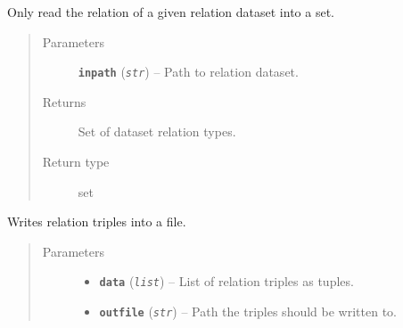 \documentclass[letterpaper,10pt,english]{sphinxmanual}
\begin{document}

\begin{fulllineitems}
\label{src.trans_e:src.trans_e.partition_data.read_only_relations_into_set}
Only read the relation of a given relation dataset into a set.
\begin{quote}\begin{description}
\item[{Parameters}] \leavevmode
\textbf{\texttt{inpath}} (\emph{\texttt{str}}) -- Path to relation dataset.

\item[{Returns}] \leavevmode
Set of dataset relation types.

\item[{Return type}] \leavevmode
set

\end{description}\end{quote}

\end{fulllineitems}


\begin{fulllineitems}
\label{src.trans_e:src.trans_e.partition_data.write_data_in_file}
Writes relation triples into a file.
\begin{quote}\begin{description}
\item[{Parameters}] \leavevmode\begin{itemize}
\item {} 
\textbf{\texttt{data}} (\emph{\texttt{list}}) -- List of relation triples as tuples.

\item {} 
\textbf{\texttt{outfile}} (\emph{\texttt{str}}) -- Path the triples should be written to.

\end{itemize}

\end{description}\end{quote}

\end{fulllineitems}
\end{document}
